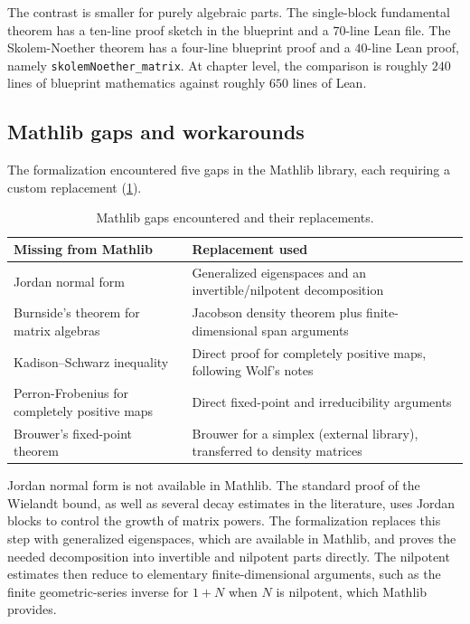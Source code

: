 The contrast is smaller for purely algebraic parts. The single-block fundamental theorem has a ten-line proof sketch in the blueprint and a $70$-line Lean file. The Skolem-Noether theorem has a four-line blueprint proof and a $40$-line Lean proof, namely \texttt{skolemNoether\_matrix}. At chapter level, the comparison is roughly $240$ lines of blueprint mathematics against roughly $650$ lines of Lean.



\subsection{Mathlib gaps and workarounds}\label{sec:mathlib_gaps}

The formalization encountered five gaps in the Mathlib library, each requiring a custom replacement (\cref{tab:mathlib_gaps}).


\begin{table}[h]
    \caption{\label{tab:mathlib_gaps}Mathlib gaps encountered and their replacements.}
    \begin{tabular}{ll}
        \toprule
        {Missing from Mathlib}                        & {Replacement used}                                                        \\
        \midrule
        Jordan normal form                            & Generalized eigenspaces and an invertible/nilpotent decomposition         \\
        Burnside's theorem for matrix algebras        & Jacobson density theorem plus finite-dimensional span arguments           \\
        Kadison--Schwarz inequality                   & Direct proof for completely positive maps, following Wolf's notes         \\
        Perron-Frobenius for completely positive maps & Direct fixed-point and irreducibility arguments                           \\
        Brouwer's fixed-point theorem                 & Brouwer for a simplex (external library), transferred to density matrices \\
        \bottomrule
    \end{tabular}
\end{table}


Jordan normal form is not available in Mathlib. The standard proof of the Wielandt bound, as well as several decay estimates in the literature, uses Jordan blocks to control the growth of matrix powers. The formalization replaces this step with generalized eigenspaces, which are available in Mathlib, and proves the needed decomposition into invertible and nilpotent parts directly. The nilpotent estimates then reduce to elementary finite-dimensional arguments, such as the finite geometric-series inverse for $1+N$ when $N$ is nilpotent, which Mathlib provides.

